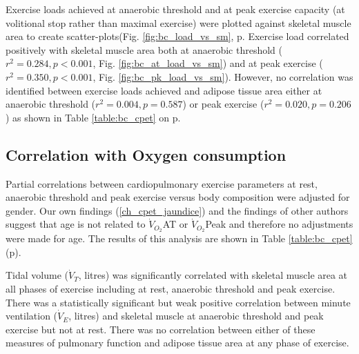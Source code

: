 Exercise loads achieved at anaerobic threshold and at peak exercise capacity (at volitional stop rather than maximal exercise) were plotted against skeletal muscle area to create scatter-plots(Fig. \ref{fig:bc_load_vs_sm}, p\pageref{fig:bc_load_vs_sm}. 
Exercise load correlated positively with skeletal muscle area both at anaerobic threshold ($r^{2} = 0.284, p < 0.001$, Fig. \ref{fig:bc_at_load_vs_sm}) and at peak exercise ($r^{2} = 0.350, p < 0.001$, Fig. \ref{fig:bc_pk_load_vs_sm}). 
However, no correlation was identified between exercise loads achieved and adipose tissue area either at anaerobic threshold ($r^{2} = 0.004, p = 0.587$) or peak exercise ($r^{2} = 0.020, p = 0.206$) as shown in Table \ref{table:bc_cpet} on p\pageref{table:bc_cpet}. 


\subsection{Correlation with Oxygen consumption}



Partial correlations between cardiopulmonary exercise parameters at rest, anaerobic threshold and peak exercise versus body composition were adjusted for gender. 
Our own findings (\ref{ch_cpet_jaundice}) and the findings of other authors suggest that age is not related to $\dot{V}_{O_2}$AT or $\dot{V}_{O_2}$Peak and therefore no adjustments were made for age. 
The results of this analysis are shown in Table \ref{table:bc_cpet} (p\pageref{table:bc_cpet}).

Tidal volume ($\dot{V}_T$, litres) was significantly correlated with skeletal muscle area at all phases of exercise including at rest, anaerobic threshold and peak exercise. 
There was a statistically significant but weak positive correlation between minute ventilation ($\dot{V}_E$, litres) and skeletal muscle at anaerobic threshold and peak exercise but not at rest. 
There was no correlation between either of these measures of pulmonary function and adipose tissue area at any phase of exercise.

